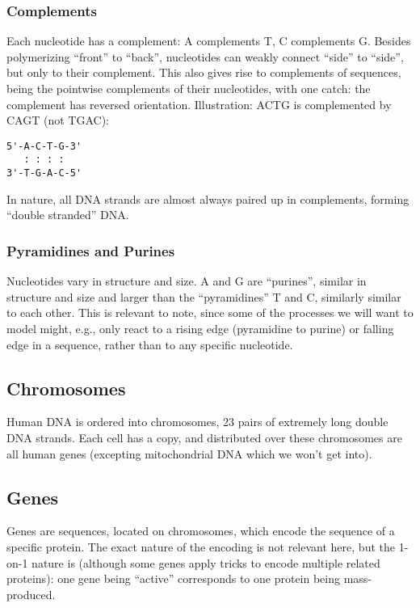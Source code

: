 \documentclass[fleqn]{book}
\begin{document}
\subsubsection{Complements}\label{complements}

Each nucleotide has a complement: A complements T, C complements G.
Besides polymerizing ``front'' to ``back'', nucleotides can weakly
connect ``side'' to ``side'', but only to their complement. This also
gives rise to complements of sequences, being the pointwise complements
of their nucleotides, with one catch: the complement has reversed
orientation. Illustration: ACTG is complemented by CAGT (not TGAC):

\begin{verbatim}
5'-A-C-T-G-3'
   : : : :
3'-T-G-A-C-5'
\end{verbatim}

In nature, all DNA strands are almost always paired up in complements,
forming ``double stranded'' DNA.

\subsubsection{Pyramidines and Purines}\label{pyramidines-and-purines}

Nucleotides vary in structure and size. A and G are ``purines'', similar
in structure and size and larger than the ``pyramidines'' T and C,
similarly similar to each other. This is relevant to note, since some of
the processes we will want to model might, e.g., only react to a rising
edge (pyramidine to purine) or falling edge in a sequence, rather than
to any specific nucleotide.

\subsection{Chromosomes}\label{chromosomes}

Human DNA is ordered into chromosomes, 23 pairs of extremely long double
DNA strands. Each cell has a copy, and distributed over these
chromosomes are all human genes (excepting mitochondrial DNA which we
won't get into).

\subsection{Genes}\label{genes}

Genes are sequences, located on chromosomes, which encode the sequence
of a specific protein. The exact nature of the encoding is not relevant
here, but the 1-on-1 nature is (although some genes apply tricks to
encode multiple related proteins): one gene being ``active'' corresponds
to one protein being mass-produced.
\end{document}
